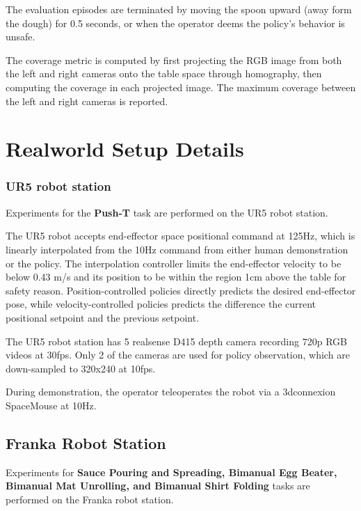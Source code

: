 The evaluation episodes are terminated by moving the spoon upward (away form the dough) for 0.5 seconds, or when the operator deems the policy's behavior is unsafe.

The coverage metric is computed by first projecting the RGB image from both the left and right cameras onto the table space through homography, then computing the coverage in each projected image. The maximum coverage between the left and right cameras is reported.






\section{Realworld Setup Details}

\subsubsection{UR5 robot station}
\label{sec:ur5_setup}
Experiments for the \textbf{Push-T} task are performed on the UR5 robot station.

The UR5 robot accepts end-effector space positional command at 125Hz, which is linearly interpolated from the 10Hz command from either human demonstration or the policy. The interpolation controller limits the end-effector velocity to be below 0.43 m/s and its position to be within the region 1cm above the table for safety reason. Position-controlled policies directly predicts the desired end-effector pose, while velocity-controlled policies predicts the difference the current positional setpoint and the previous setpoint.

The UR5 robot station has 5 realsense D415 depth camera recording 720p RGB videos at 30fps. Only 2 of the cameras are used for policy observation, which are down-sampled to 320x240 at 10fps.

During demonstration, the operator teleoperates the robot via a 3dconnexion SpaceMouse at 10Hz.

\subsection{Franka Robot Station}
\label{sec:franka_setup}
Experiments for \textbf{Sauce Pouring and Spreading, Bimanual Egg Beater, Bimanual Mat Unrolling, and
Bimanual Shirt Folding} tasks are performed on the Franka robot station.

